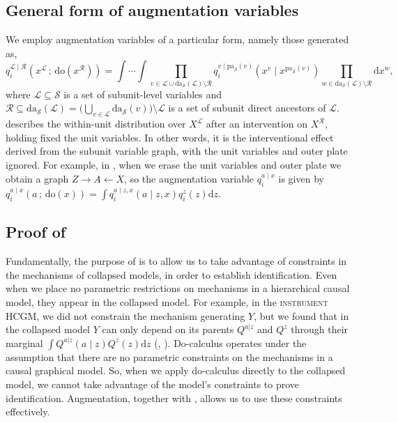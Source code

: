 \documentclass[12pt]{article}
\newcommand{\rmdo}{\mathrm{do}}
\newcommand{\s}{\, ; \,}
\newcommand{\di}{\mathrm{d}}
\newcommand{\pa}{\mathrm{pa}}
\newcommand{\da}{\mathrm{da}}
\begin{document}
\subsection{General form of augmentation variables} \label{apx:aug_var_form} We employ augmentation variables of a particular form, namely those generated as,
\begin{equation}\label{eqn:augment_mech}
        q_i^{\mathcal{L} \mid \mathcal{R}}(x^{\mathcal{L}} \s \rmdo(x^{\mathcal{R}})) = \int \cdots \int \prod_{v \in \mathcal{L} \cup \da_\mathcal{S}(\mathcal{L}) \setminus \mathcal{R}} q_i^{v \mid \pa_\mathcal{S}(v)}(x^v \mid x^{\pa_\mathcal{S}(v)})\prod_{w \in \da_\mathcal{S}(\mathcal{L}) \setminus \mathcal{R}} \di x^{w},
\end{equation}
where $\mathcal{L} \subseteq \mathcal{S}$ is a set of subunit-level variables and $\mathcal{R} \subseteq \da_\mathcal{S}(\mathcal{L}) = \big(\bigcup_{v \in \mathcal{L}} \da_\mathcal{S}(v)\big)\setminus \mathcal{L}$ is a set of subunit direct ancestors of $\mathcal{L}$.
 describes the within-unit distribution over $X^{\mathcal{L}}$ after an intervention on $X^{\mathcal{R}}$, holding fixed the unit variables. In other words, it is the interventional effect derived from the subunit variable graph, with the unit variables and outer plate ignored.
For example, in , when we erase the unit variables and outer plate we obtain a graph $Z \rightarrow A \leftarrow X$, so the augmentation variable $q_i^{a \mid x}$ is given by $q_i^{a \mid x}(a \s \rmdo(x)) = \int q_i^{a \mid z, x}(a \mid z, x) q_i^z(z) \di z$.

\subsection{Proof of }
Fundamentally, the purpose of  is to allow us to take advantage of constraints in the mechanisms of collapsed models, in order to establish identification.
Even when we place no parametric restrictions on mechanisms in a hierarchical causal model, they appear in the collapsed model.
For example, in the \textsc{instrument} HCGM, we did not constrain the mechanism generating $Y$, but we found that in the collapsed model $Y$ can only depend on its parents $Q^{a|z}$ and $Q^{z}$ through their marginal $\int Q^{a|z}(a \mid z) Q^z(z) \di z$ (, ).
Do-calculus operates under the assumption that there are no parametric constraints on the mechanisms in a causal graphical model.
So, when we apply do-calculus directly to the collapsed model, we cannot take advantage of the model's constraints to prove identification.
Augmentation, together with , allows us to use these constraints effectively.
\end{document}
